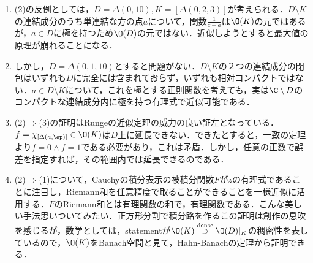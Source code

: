 \documentclass[uplatex, dvipdfmx]{jsreport}
\begin{document}
\begin{remarks}\mbox{}
    \begin{enumerate}
        \item (2)の反例としては，$D=\Delta(0,10),K=[\Delta(0,2,3)]$が考えられる．$D\setminus K$の連結成分のうち単連結な方の点$a$について，関数$\frac{1}{z-a}$は$\O(K)$の元ではあるが，$a\in D$に極を持つため$\O(D)$の元ではない．近似しようとすると最大値の原理が崩れることになる．
        \item しかし，$D=\Delta(0,1,10)$とすると問題がない．$D\setminus K$の２つの連結成分の閉包はいずれも$D$に完全には含まれておらず，いずれも相対コンパクトではない．$a\in D\setminus K$について，これを極とする正則関数を考えても，実は$\C\setminus D$のコンパクトな連結成分内に極を持つ有理式で近似可能である．
        \item (2)$\Rightarrow$(3)の証明はRungeの近似定理の威力の良い証左となっている．$f=\chi_{[\Delta(a,\ep)]}\in\O(K)$は$D$上に延長できない．できたとすると，一致の定理より$f=0\land f=1$である必要があり，これは矛盾．しかし，任意の正数で誤差を指定すれば，その範囲内では延長できるのである．
        \item (2)$\Rightarrow$(1)について，Cauchyの積分表示の被積分関数$F$が$z$の有理式であることに注目し，Riemann和を任意精度で取ることができることを一様近似に活用する．$F$のRiemann和とは有理関数の和で，有理関数である．こんな美しい手法思いついてみたい．正方形分割で積分路を作るこの証明は創作の息吹を感じるが，数学としては，statementが$\O(K)\overset{\textrm{dense}}{\supset}\O(D)|_K$の稠密性を表しているので，$\O(K)$をBanach空間と見て，Hahn-Banachの定理から証明できる．
    \end{enumerate}
\end{remarks}
\end{document}
